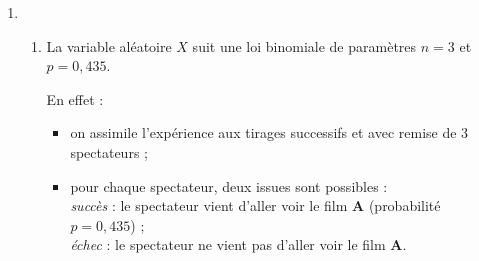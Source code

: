 \begin{corrige}
\begin{enumerate}
{               \par
               Dans le cas présent, on sait que l'événement $A$ est vérifié et on souhaite déterminer la probabilité de l'événement $R$. On recherche donc $p_A(R)$.
          }
          \par
          D'après la formule des probabilités conditionnelles :
          \par
          $p_A(R)=\dfrac{p(A\cap R)}{p(A)}=\dfrac{0,3 \times 0,4}{0,435}$\nosp$=\dfrac{0,12}{0,435} \approx 0,276\ $ (à $10^{-3}$ près).
          \item %
          \begin{enumerate}[label=\alph*.]
               \item %
               La variable aléatoire $X$ suit une loi binomiale de paramètres ${n=3}$ et ${p=0,435}$.
               \par
               En effet :
               \par
               \begin{itemize}
                    \item on assimile l'expérience aux tirages successifs et avec remise de 3 spectateurs ;
                    \item pour chaque spectateur, deux issues sont possibles :
\\
 \textit{succès} : le spectateur vient d'aller voir le film \textbf{A} (probabilité $p=0,435$) ;
\\
 \textit{échec} : le spectateur ne vient pas d'aller voir le film \textbf{A}.


\end{itemize}
\end{enumerate}
\end{enumerate}
\end{corrige}
